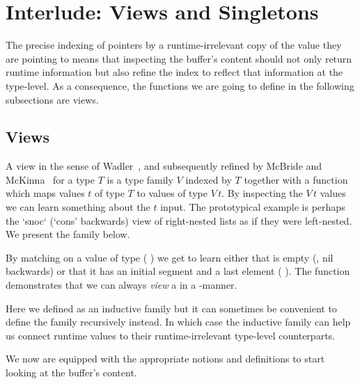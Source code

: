 
\section{Interlude: Views and Singletons}\label{sec:view}

The precise indexing of pointers by a runtime-irrelevant copy of the value
they are pointing to means that inspecting the buffer's content should
not only return runtime information but also refine the index to reflect
that information at the type-level.
%
As a consequence, the functions we are going to define in the following
subsections are views.

\subsection{Views}

A view
in the sense of Wadler~\cite{DBLP:conf/popl/Wadler87},
and subsequently refined by McBride and McKinna~\cite{DBLP:journals/jfp/McBrideM04}
for a type $T$ is a type family $V$ indexed by $T$ together
with a function which maps values $t$ of type $T$ to values of type
$V\,t$.
%
By inspecting the $V\,t$ values we can learn something about the
$t$ input.
%
The prototypical example is perhaps the `snoc` (`cons' backwards) view
of right-nested lists as if they were left-nested.
We present the  family below.


By matching on a value of type
( ) we get to learn
either that  is empty (, nil backwards)
or that it has an initial segment  and a last element
 ( \IdrisData{:<} ).
%
The function  demonstrates that we can always
\emph{view} a  in a -manner.


Here we defined  as an inductive family but it can
sometimes be convenient to define the family recursively instead.
In which case the  inductive family can
help us connect runtime values to their
runtime-irrelevant type-level counterparts.



We now are equipped with the appropriate notions and definitions to
start looking at the buffer's content.
